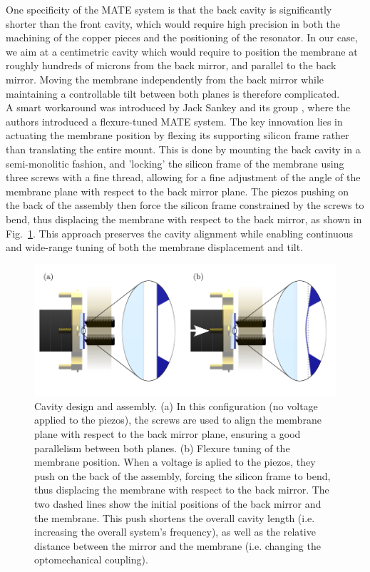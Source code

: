 One specificity of the MATE system is that the back cavity is significantly shorter than the front cavity, which would require high precision in both the machining of the copper pieces and the positioning of the resonator. In our case, we aim at a centimetric cavity which would require to position the membrane at roughly hundreds of microns from the back mirror, and parallel to the back mirror. Moving the membrane independently from the back mirror while maintaining a controllable tilt between both planes is therefore complicated. \\


A smart workaround was introduced by Jack Sankey and its group \cite{Sankey2010}, where the authors introduced a flexure-tuned MATE system. The key innovation lies in actuating the membrane position by flexing its supporting silicon frame rather than translating the entire mount. This is done by mounting the back cavity in a semi-monolitic fashion, and 'locking' the silicon frame of the membrane using three screws with a fine thread, allowing for a fine adjustment of the angle of the membrane plane with respect to the back mirror plane. The piezos pushing on the back of the assembly then force the silicon frame constrained by the screws to bend, thus displacing the membrane with respect to the back mirror, as shown in Fig.~\ref{fig:flexure tune}. 
This approach preserves the cavity alignment while enabling continuous and wide-range tuning of both the membrane displacement and tilt. 


\begin{figure}[H]
    \centering  
    \includegraphics[width=\textwidth]{./chap5/fig/flexure tune.pdf}
    \caption{Cavity design and assembly. (a) In this configuration (no voltage applied to the piezos), the screws are used to align the membrane plane with respect to the back mirror plane, ensuring a good parallelism between both planes. (b) Flexure tuning of the membrane position. When a voltage is aplied to the piezos, they push on the back of the assembly, forcing the silicon frame to bend, thus displacing the membrane with respect to the back mirror. The two dashed lines show the initial positions of the back mirror and the membrane. This push shortens the overall cavity length (i.e. increasing the overall system's frequency), as well as the relative distance between the mirror and the membrane (i.e. changing the optomechanical coupling). }
    \label{fig:flexure tune}
\end{figure}


